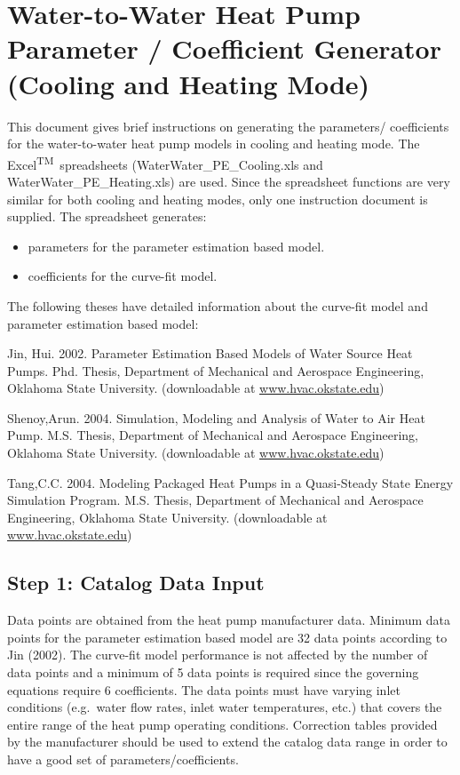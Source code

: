 \section{Water-to-Water Heat Pump Parameter / Coefficient Generator (Cooling and Heating Mode)}\label{water-to-water-heat-pump-parameter-coefficient-generator-cooling-and-heating-mode}

This document gives brief instructions on generating the parameters/ coefficients for the water-to-water heat pump models in cooling and heating mode. The Excel\textsuperscript{TM}\ spreadsheets (WaterWater\_PE\_Cooling.xls and WaterWater\_PE\_Heating.xls) are used. Since the spreadsheet functions are very similar for both cooling and heating modes, only one instruction document is supplied. The spreadsheet generates:

\begin{itemize}
\item
  parameters for the parameter estimation based model.
\item
  coefficients for the curve-fit model.
\end{itemize}

The following theses have detailed information about the curve-fit model and parameter estimation based model:

Jin, Hui. 2002. Parameter Estimation Based Models of Water Source Heat Pumps. Phd. Thesis, Department of Mechanical and Aerospace Engineering, Oklahoma State University. (downloadable at \href{http://www.hvac.okstate.edu}{www.hvac.okstate.edu})

Shenoy,Arun. 2004. Simulation, Modeling and Analysis of Water to Air Heat Pump. M.S. Thesis, Department of Mechanical and Aerospace Engineering, Oklahoma State University. (downloadable at \href{http://www.hvac.okstate.edu}{www.hvac.okstate.edu})

Tang,C.C. 2004. Modeling Packaged Heat Pumps in a Quasi-Steady State Energy Simulation Program. M.S. Thesis, Department of Mechanical and Aerospace Engineering, Oklahoma State University. (downloadable at \href{http://www.hvac.okstate.edu}{www.hvac.okstate.edu})

\subsection{Step 1: Catalog Data Input}\label{step-1-catalog-data-input-001}

Data points are obtained from the heat pump manufacturer data. Minimum data points for the parameter estimation based model are 32 data points according to Jin (2002). The curve-fit model performance is not affected by the number of data points and a minimum of 5 data points is required since the governing equations require 6 coefficients. The data points must have varying inlet conditions (e.g.~water flow rates, inlet water temperatures, etc.) that covers the entire range of the heat pump operating conditions. Correction tables provided by the manufacturer should be used to extend the catalog data range in order to have a good set of parameters/coefficients.

